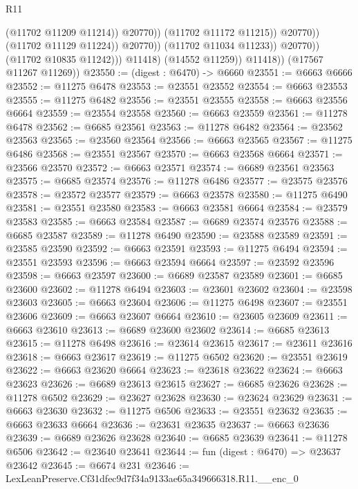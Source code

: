 \begin{lexlean}{R11}
\begin{coremodule}
                                          (@11702 @11209 @11214))
                                        @20770))
                                    (@11702 @11172 @11215))
                                  @20770))
                              (@11702 @11129 @11224))
                            @20770))
                        (@11702 @11034 @11233))
                      @20770))
                  (@11702 @10835 @11242)))
              @11418)
            (@14552 @11259))
          @11418))
      (@17567 @11267 @11269))
@23550 := (digest : @6470) -> @6660
@23551 := @6663 @6666
@23552 := @11275 @6478
@23553 := @23551 @23552
@23554 := @6663 @23553
@23555 := @11275 @6482
@23556 := @23551 @23555
@23558 := @6663 @23556 @6664
@23559 := @23554 @23558
@23560 := @6663 @23559
@23561 := @11278 @6478
@23562 := @6685 @23561
@23563 := @11278 @6482
@23564 := @23562 @23563
@23565 := @23560 @23564
@23566 := @6663 @23565
@23567 := @11275 @6486
@23568 := @23551 @23567
@23570 := @6663 @23568 @6664
@23571 := @23566 @23570
@23572 := @6663 @23571
@23574 := @6689 @23561 @23563
@23575 := @6685 @23574
@23576 := @11278 @6486
@23577 := @23575 @23576
@23578 := @23572 @23577
@23579 := @6663 @23578
@23580 := @11275 @6490
@23581 := @23551 @23580
@23583 := @6663 @23581 @6664
@23584 := @23579 @23583
@23585 := @6663 @23584
@23587 := @6689 @23574 @23576
@23588 := @6685 @23587
@23589 := @11278 @6490
@23590 := @23588 @23589
@23591 := @23585 @23590
@23592 := @6663 @23591
@23593 := @11275 @6494
@23594 := @23551 @23593
@23596 := @6663 @23594 @6664
@23597 := @23592 @23596
@23598 := @6663 @23597
@23600 := @6689 @23587 @23589
@23601 := @6685 @23600
@23602 := @11278 @6494
@23603 := @23601 @23602
@23604 := @23598 @23603
@23605 := @6663 @23604
@23606 := @11275 @6498
@23607 := @23551 @23606
@23609 := @6663 @23607 @6664
@23610 := @23605 @23609
@23611 := @6663 @23610
@23613 := @6689 @23600 @23602
@23614 := @6685 @23613
@23615 := @11278 @6498
@23616 := @23614 @23615
@23617 := @23611 @23616
@23618 := @6663 @23617
@23619 := @11275 @6502
@23620 := @23551 @23619
@23622 := @6663 @23620 @6664
@23623 := @23618 @23622
@23624 := @6663 @23623
@23626 := @6689 @23613 @23615
@23627 := @6685 @23626
@23628 := @11278 @6502
@23629 := @23627 @23628
@23630 := @23624 @23629
@23631 := @6663 @23630
@23632 := @11275 @6506
@23633 := @23551 @23632
@23635 := @6663 @23633 @6664
@23636 := @23631 @23635
@23637 := @6663 @23636
@23639 := @6689 @23626 @23628
@23640 := @6685 @23639
@23641 := @11278 @6506
@23642 := @23640 @23641
@23644 := fun (digest : @6470) => @23637 @23642
@23645 := @6674 @231
@23646 := LexLeanPreserve.Cf31dfec9d7f34a9133ae65a349666318.R11.__enc_0

\end{coremodule}
\end{lexlean}
